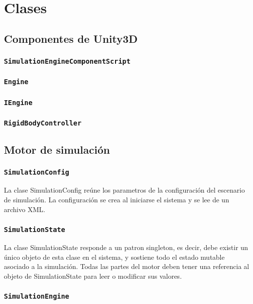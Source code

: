 \documentclass[a4paper,oneside]{article}
\begin{document}
\section{Clases}


\subsection{Componentes de Unity3D}

\subsubsection{\texttt{SimulationEngineComponentScript}}
\subsubsection{\texttt{Engine}}
\subsubsection{\texttt{IEngine}}
\subsubsection{\texttt{RigidBodyController}}


\subsection{Motor de simulación}

\subsubsection{\texttt{SimulationConfig}}

La clase SimulationConfig reúne los parametros de la configuración del escenario
de simulación.
La configuración se crea al iniciarse el sistema y se lee de un archivo XML.

\subsubsection{\texttt{SimulationState}}

La clase SimulationState responde a un patron singleton, es decir, debe existir
un único objeto de esta clase en el sistema, y sostiene todo el estado mutable
asociado a la simulación. 
Todas las partes del motor deben tener una referencia al objeto de 
SimulationState para leer o modificar sus valores. 

\subsubsection{\texttt{SimulationEngine}}
\end{document}
